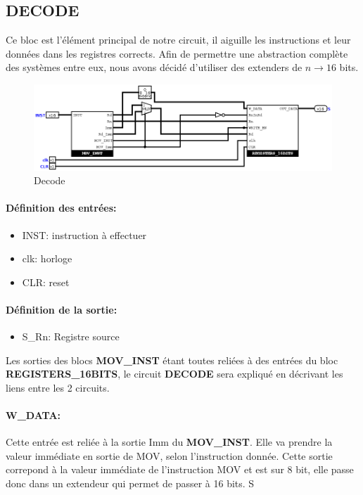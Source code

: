 \documentclass[a4paper]{article} %
\begin{document}
\subsection{DECODE}
Ce bloc est l'élément principal de notre circuit, il aiguille les instructions et leur données dans les registres corrects.
Afin de permettre une abstraction complète des systèmes entre eux, nous avons décidé d'utiliser des extenders de $n \rightarrow 16$ bits.\\
\begin{figure}[H]
    \centering
    \includegraphics[width=1\textwidth]{src/DECODE.png}
    \caption{Decode}
    \label{decode_img}
\end{figure}

\paragraph{Définition des entrées:}
\begin{itemize}
    \item     INST: instruction à effectuer
    \item     clk: horloge
    \item     CLR: reset
\end{itemize}

\paragraph{Définition de la sortie:}
\begin{itemize}
    \item     S\_Rn: Registre source
\end{itemize}
\medskip
Les sorties des blocs \textbf{MOV\_INST} étant toutes reliées à des entrées du bloc \textbf{REGISTERS\_16BITS}, le circuit \textbf{DECODE} sera expliqué en décrivant les liens entre les 2 circuits.\\

\paragraph{W\_DATA:} 
Cette entrée est reliée à la sortie Imm du \textbf{MOV\_INST}. Elle va prendre la valeur immédiate en sortie de MOV, selon l'instruction donnée. Cette sortie correpond à la valeur immédiate de l'instruction MOV et est sur 8 bit, elle passe donc dans un extendeur qui permet de passer à 16 bits. S
\end{document}
